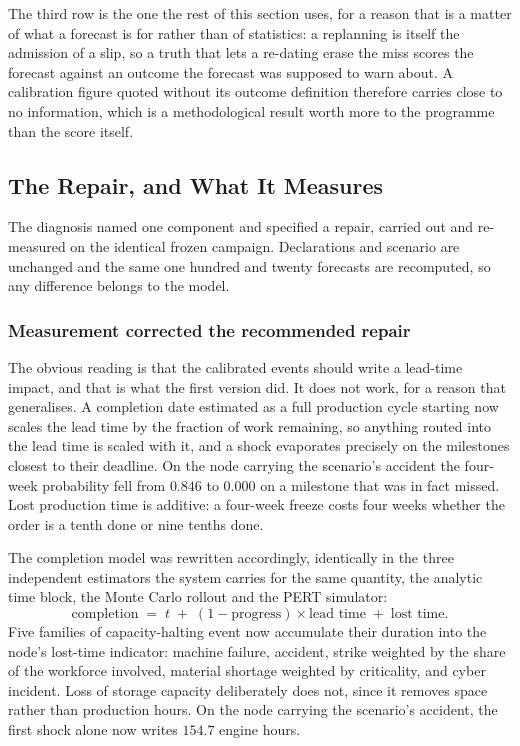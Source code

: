 The third row is the one the rest of this section uses, for a reason that is a matter of what
a forecast is for rather than of statistics: a replanning is itself the admission of a slip,
so a truth that lets a re-dating erase the miss scores the forecast against an outcome the
forecast was supposed to warn about. A calibration figure quoted without its outcome
definition therefore carries close to no information, which is a methodological result worth
more to the programme than the score itself.

\subsection{The Repair, and What It Measures}
\label{sec:reparation}

The diagnosis named one component and specified a repair, carried out and re-measured on the
identical frozen campaign. Declarations and scenario are unchanged and the same one hundred
and twenty forecasts are recomputed, so any difference belongs to the model.

\subsubsection{Measurement corrected the recommended repair}

The obvious reading is that the calibrated events should write a lead-time impact, and that is
what the first version did. It does not work, for a reason that generalises. A completion date
estimated as a full production cycle starting now scales the lead time by the fraction of work
remaining, so anything routed into the lead time is scaled with it, and a shock evaporates
precisely on the milestones closest to their deadline. On the node carrying the scenario's
accident the four-week probability fell from $0.846$ to $0.000$ on a milestone that was in fact
missed. Lost production time is additive: a four-week freeze costs four weeks whether the order
is a tenth done or nine tenths done.

The completion model was rewritten accordingly, identically in the three independent estimators
the system carries for the same quantity, the analytic time block, the Monte Carlo rollout and
the PERT simulator:
\begin{equation}
    \text{completion} \;=\; t \;+\; (1 - \text{progress}) \times \text{lead time}
    \;+\; \text{lost time}.
    \label{eq:achevement}
\end{equation}
Five families of capacity-halting event now accumulate their duration into the node's
lost-time indicator: machine failure, accident, strike weighted by the share of the workforce
involved, material shortage weighted by criticality, and cyber incident. Loss of storage
capacity deliberately does not, since it removes space rather than production hours. On the
node carrying the scenario's accident, the first shock alone now writes $154.7$ engine hours.


